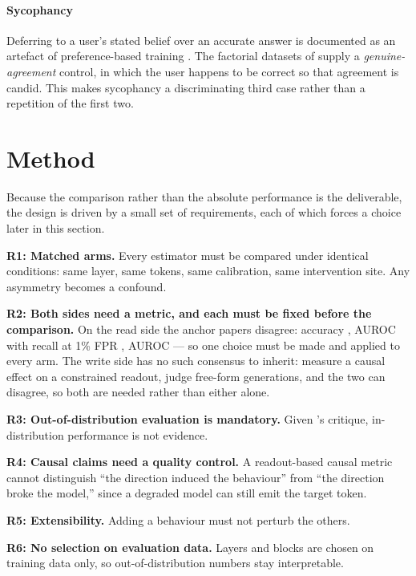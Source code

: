 \documentclass[conference]{IEEEtran}
\begin{document}
\paragraph{Sycophancy}
Deferring to a user's stated belief over an accurate answer is documented as an
artefact of preference-based training \citep{perez2023,sharma2023}. The factorial
datasets of \citet{cincynlp2025} supply a \emph{genuine-agreement} control, in which
the user happens to be correct so that agreement is candid. This makes sycophancy a
discriminating third case rather than a repetition of the first two.

\section{Method}

Because the comparison rather than the absolute performance is the deliverable,
the design is driven by a small set of requirements, each of which forces a
choice later in this section.

\textbf{R1: Matched arms.} Every estimator must be compared under identical
conditions: same layer, same tokens, same calibration, same intervention site.
Any asymmetry becomes a confound.

\textbf{R2: Both sides need a metric, and each must be fixed before the
comparison.} On the read side the anchor papers disagree: accuracy
\citep{marks2024}, AUROC with recall at 1\% FPR \citep{goldowsky2025}, AUROC
\citep{mckenzie2025} --- so one choice must be made and applied to every arm. The
write side has no such consensus to inherit: \citet{marks2024} measure a causal
effect on a constrained readout, \citet{rimsky2024} judge free-form generations,
and the two can disagree, so both are needed rather than either alone.

\textbf{R3: Out-of-distribution evaluation is mandatory.} Given
\citeauthor{levinstein2024}'s critique, in-distribution performance is not
evidence.

\textbf{R4: Causal claims need a quality control.} A readout-based causal metric
cannot distinguish ``the direction induced the behaviour'' from ``the direction
broke the model,'' since a degraded model can still emit the target token.

\textbf{R5: Extensibility.} Adding a behaviour must not perturb the others.

\textbf{R6: No selection on evaluation data.} Layers and blocks are chosen on
training data only, so out-of-distribution numbers stay interpretable.
\end{document}
